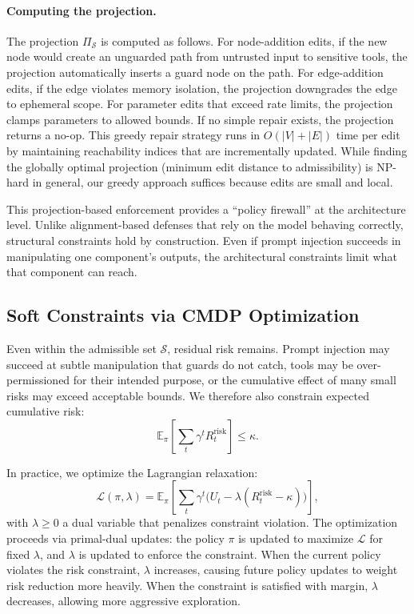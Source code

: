 \documentclass[sigconf,anonymous]{acmart}
\newcommand{\E}{\mathbb{E}}
\begin{document}
\paragraph{Computing the projection.} The projection $\Pi_{\mathcal{S}}$ is computed as follows. For node-addition edits, if the new node would create an unguarded path from untrusted input to sensitive tools, the projection automatically inserts a guard node on the path. For edge-addition edits, if the edge violates memory isolation, the projection downgrades the edge to ephemeral scope. For parameter edits that exceed rate limits, the projection clamps parameters to allowed bounds. If no simple repair exists, the projection returns a no-op. This greedy repair strategy runs in $O(|V| + |E|)$ time per edit by maintaining reachability indices that are incrementally updated. While finding the globally optimal projection (minimum edit distance to admissibility) is NP-hard in general, our greedy approach suffices because edits are small and local.

This projection-based enforcement provides a ``policy firewall'' at the architecture level. Unlike alignment-based defenses that rely on the model behaving correctly, structural constraints hold by construction. Even if prompt injection succeeds in manipulating one component's outputs, the architectural constraints limit what that component can reach.

\subsection{Soft Constraints via CMDP Optimization}

Even within the admissible set $\mathcal{S}$, residual risk remains. Prompt injection may succeed at subtle manipulation that guards do not catch, tools may be over-permissioned for their intended purpose, or the cumulative effect of many small risks may exceed acceptable bounds. We therefore also constrain expected cumulative risk:
\begin{equation}
\E_\pi\left[\sum_t \gamma^t R_t^{\text{risk}}\right] \le \kappa.
\end{equation}

In practice, we optimize the Lagrangian relaxation:
\begin{equation}
\label{eq:lagrangian}
\mathcal{L}(\pi, \lambda) = \E_\pi\left[\sum_t \gamma^t \big(U_t - \lambda (R_t^{\text{risk}} - \kappa)\big)\right],
\end{equation}
with $\lambda \ge 0$ a dual variable that penalizes constraint violation. The optimization proceeds via primal-dual updates: the policy $\pi$ is updated to maximize $\mathcal{L}$ for fixed $\lambda$, and $\lambda$ is updated to enforce the constraint. When the current policy violates the risk constraint, $\lambda$ increases, causing future policy updates to weight risk reduction more heavily. When the constraint is satisfied with margin, $\lambda$ decreases, allowing more aggressive exploration.
\end{document}
